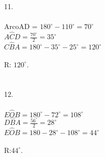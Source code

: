 \documentclass[12pt]{article}
\begin{document}
11.\\\\
ArcoAD = $180^{\circ}-110^{\circ}=70^{\circ}$\\
$A\hat{C}D=\frac{70^{\circ}}{2}=35^{\circ}$\\
$C\hat{B}A=180^{\circ}-35^{\circ}-25^{\circ}=120^{\circ}$\\\\
R: $120^{\circ}$.\\\\\\

12.\\\\
$E\hat{O}B=180^{\circ}-72^{\circ}=108^{\circ}$\\
$D\hat{B}A=\frac{56^{\circ}}{2}=28^{\circ}$\\
$E\hat{O}B=180-28^{\circ}-108^{\circ}=44^{\circ}$\\\\
R:$44^{\circ}$.\\
\end{document}
